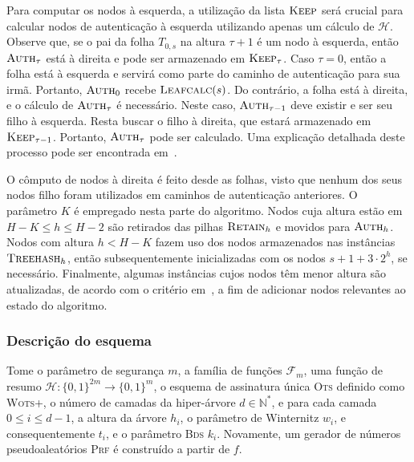 \documentclass{ufsctex/ufsctex}
\newcommand{\hh}{\mathcal{H}}
\newcommand{\binwds}[1]{\{0, 1\}^{#1}}
\newcommand{\bds}{\textsc{Bds}}
\newcommand{\wotsplus}{\textsc{Wots+}}
\begin{document}
Para computar os nodos à esquerda, a utilização da lista $\textsc{Keep}$ será
crucial para calcular nodos de autenticação à esquerda utilizando apenas um
cálculo de $\hh{}$. Observe que, se o pai da folha $T_{0, s}$ na altura $\tau +
1$ é um nodo à esquerda, então $\textsc{Auth}_{\tau}$ está à direita e pode ser
armazenado em $\textsc{Keep}_{\tau}$. Caso $\tau = 0$, então a folha está à
esquerda e servirá como parte do caminho de autenticação para sua irmã.
Portanto, $\textsc{Auth}_{0}$ recebe $\textsc{Leafcalc}(s)$. Do contrário, a
folha está à direita, e o cálculo de $\textsc{Auth}_{\tau}$ é necessário. Neste
caso, $\textsc{Auth}_{\tau - 1}$ deve existir e ser seu filho à esquerda. Resta
buscar o filho à direita, que estará armazenado em $\textsc{Keep}_{\tau - 1}$.
Portanto, $\textsc{Auth}_{\tau}$ pode ser calculado. Uma explicação detalhada
deste processo pode ser encontrada em~\cite[Seção
2.1]{Buchmann:inproc:2008:oct}.

O cômputo de nodos à direita é feito desde as folhas, visto que nenhum dos seus
nodos filho foram utilizados em caminhos de autenticação anteriores. O
parâmetro $K$ é empregado nesta parte do algoritmo. Nodos cuja altura estão em
$H - K \leq h \leq H - 2$ são retirados das pilhas $\textsc{Retain}_{h}$ e
movidos para $\textsc{Auth}_{h}$. Nodos com altura $h < H - K$ fazem uso dos
nodos armazenados nas instâncias $\textsc{Treehash}_{h}$, então
subsequentemente inicializadas com os nodos $s + 1 + 3 \cdot 2^{h}$, se
necessário. Finalmente, algumas instâncias cujos nodos têm menor altura são
atualizadas, de acordo com o critério em~\cite[Seção 4.5]{Bernstein:book:2008},
a fim de adicionar nodos relevantes ao estado do algoritmo.

\subsubsection{Descrição do esquema}\label{subsubsection:xmssmt}

Tome o parâmetro de segurança $m$, a família de funções $\mathcal{F}_{m}$, uma
função de resumo $\hh{} : \binwds{2m} \longrightarrow \binwds{m}$, o esquema de
assinatura única \textsc{Ots} definido como \wotsplus{}, o número de camadas da
hiper-árvore $d \in \mathbb{N}^{*}$, e para cada camada $0 \leq i \leq d - 1$,
a altura da árvore $h_{i}$, o parâmetro de Winternitz $w_{i}$, e
consequentemente $t_{i}$, e o parâmetro \bds{} $k_{i}$. Novamente, um gerador
de números pseudoaleatórios \textsc{Prf} é construído a partir de $f$.
\end{document}
